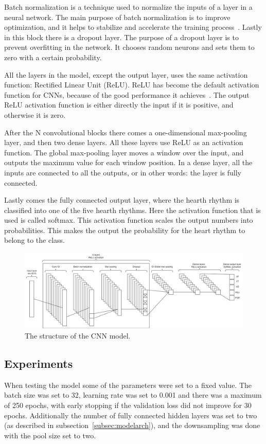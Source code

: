 Batch normalization is a technique used to normalize the inputs of a layer in a neural network. The main purpose of batch normalization is to improve optimization, and it helps to stabilize and accelerate the training process~\cite{deeplearning}. Lastly in this block there is a dropout layer. The purpose of a dropout layer is to prevent overfitting in the network. It chooses random neurons and sets them to zero with a certain probability.

All the layers in the model, except the output layer, uses the same activation function: Rectified Linear Unit (ReLU). ReLU has become the default activation function for CNNs, because of the good performance it achieves~\cite{ReLU}. The output ReLU activation function is either directly the input if it is positive, and otherwise it is zero.

After the N convolutional blocks there comes a one-dimensional max-pooling layer, and then two dense layers. All these layers use ReLU as an activation function. The global max-pooling layer moves a window over the input, and outputs the maximum value for each window position. In a dense layer, all the inputs are connected to all the outputs, or in other words: the layer is fully connected. 

Lastly comes the fully connected output layer, where the hearth rhythm is classified into one of the five hearth rhythms. Here the activation function that is used is called softmax. This activation function scales the output numbers into probabilities. This makes the output the probability for the heart rhythm to belong to the class. 

\begin{figure}[H]
    \centering
    \includegraphics[width=1\linewidth]{Img/CNN_rhythm_classify.png}
    \caption{The structure of the CNN model.}
    \label{fig:CNN_model}
\end{figure}

\subsection{Experiments}\label{subsec:experiments}
When testing the model some of the parameters were set to a fixed value. The batch size was set to 32, learning rate was set to 0.001 and there was a maximum of 250 epochs, with early stopping if the validation loss did not improve for 30 epochs. Additionally the number of fully connected hidden layers was set to two (as described in subsection~\ref{subsec:modelarch}), and the downsampling was done with the pool size set to two.

